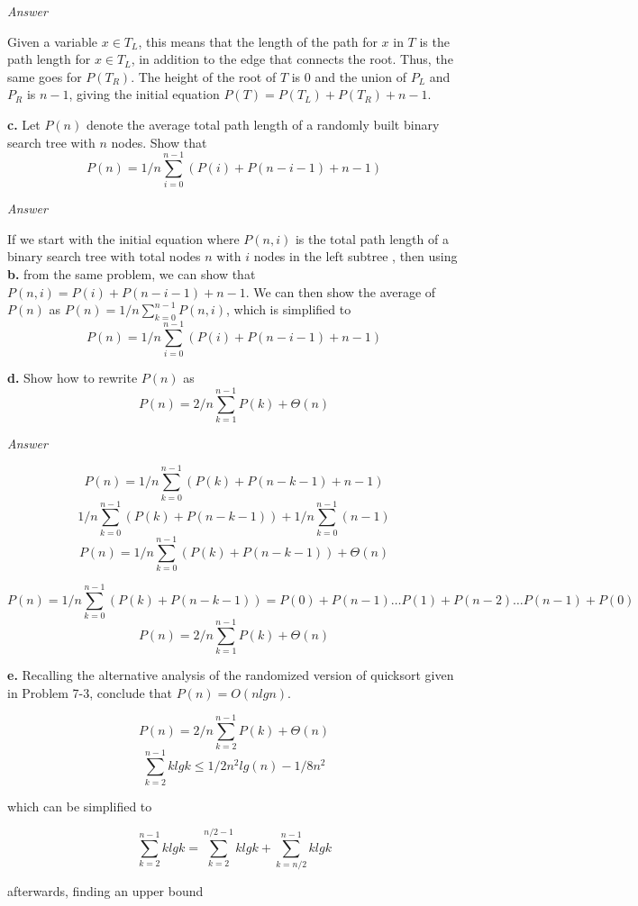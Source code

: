 \documentclass{article}
\begin{document}
\begin{enumerate}
\textit{Answer}

Given a variable $x \in T_L$, this means that the length of the path for $x$ in $T$ is the path length for $x \in T_L$, in addition to the edge that connects the root. Thus, the same goes for $P(T_R)$. The height of the root of $T$ is 0 and the union of $P_L$ and $P_R$ is $n-1$, giving the initial equation $P(T) = P(T_L) + P(T_R) + n - 1$.

\newpage

\subitem \textbf{c.} Let $P(n)$ denote the average total path length of a randomly built binary search tree with $n$ nodes. Show that $$P(n) = 1/n   \sum_{i = 0}^{n-1} (P(i) + P(n - i - 1) + n - 1)$$

\textit{Answer}

If we start with the initial equation where $P(n, i)$ is the total path length of a binary search tree with total nodes $n$ with $i$ nodes in the left subtree , then using \textbf{b.} from the same problem, we can show that $P(n, i) = P(i) + P(n - i - 1) + n - 1$. We can then show the average of $P(n)$ as $P(n) = 1/n \sum_{k = 0}^{n - 1} P(n, i)$, which is simplified to $$P(n) = 1/n   \sum_{i = 0}^{n-1} (P(i) + P(n - i - 1) + n - 1)$$

\newpage

\subitem \textbf{d.} Show how to rewrite $P(n)$ as $$P(n) = 2/n \sum_{k= 1}^{n - 1} P(k) + \Theta(n)$$

\textit{Answer}

$$P(n) = 1/n \sum_{k = 0}^{n-1} (P(k) + P(n - k -1) + n - 1)$$
$$1/n\sum_{k = 0}^{n-1}(P(k) + P(n-k-1)) + 1/n\sum_{k=0}^{n-1}(n - 1)$$
$$P(n) = 1/n \sum_{k = 0}^{n-1} (P(k) + P(n - k -1)) + \Theta(n)$$

$$P(n) = 1/n \sum_{k = 0}^{n-1} (P(k) + P(n - k -1)) = P(0) + P(n - 1) \dotso P(1) + P(n-2)  \dotso P(n-1) + P(0)$$
$$P(n) = 2/n \sum_{k= 1}^{n - 1} P(k) + \Theta(n)$$

\newpage

\subitem \textbf{e.} Recalling the alternative analysis of the randomized version of quicksort given in Problem 7-3, conclude that $P(n) = O(nlgn)$.

$$P(n) = 2/n \sum_{k= 2}^{n - 1} P(k) + \Theta(n)$$
$$\sum_{k=2}^{n-1}klgk \leq 1/2n^2 lg(n) - 1/8n^2$$

which can be simplified to

$$\sum_{k=2}^{n-1}klgk = \sum_{k=2}^{n/2 -1}klgk + \sum_{k=n/2}^{n-1} klgk$$

afterwards, finding an upper bound


\end{enumerate}
\end{document}
